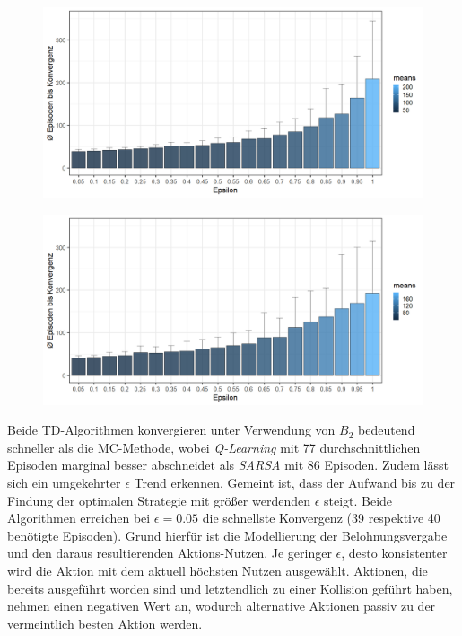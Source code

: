 \begin{figure}[H]
    \centering
    \begin{minipage}{.5\textwidth}
      \centering
      \includegraphics[width=\textwidth]{images/SimpleZ2B2QLearningA}
      \label{fig:test1}
    \end{minipage}%
    \begin{minipage}{.5\textwidth}
      \centering
      \includegraphics[width=\textwidth]{images/SimpleZ2B2SarsaA}
      \label{fig:test2}
    \end{minipage}
\end{figure}
Beide TD-Algorithmen konvergieren unter Verwendung von $B_2$ bedeutend schneller als die MC-Methode, wobei \textit{Q-Learning} mit 77 durchschnittlichen Episoden marginal besser abschneidet als \textit{SARSA} mit 86 Episoden. Zudem lässt sich ein umgekehrter $\epsilon$ Trend erkennen. Gemeint ist, dass der Aufwand bis zu der Findung der optimalen Strategie mit größer werdenden $\epsilon$ steigt. Beide Algorithmen erreichen bei $\epsilon = 0.05$ die schnellste Konvergenz (39 respektive 40 benötigte Episoden). Grund hierfür ist die Modellierung der Belohnungsvergabe und den daraus resultierenden Aktions-Nutzen. Je geringer $\epsilon$, desto konsistenter wird die Aktion mit dem aktuell höchsten Nutzen ausgewählt. Aktionen, die bereits  ausgeführt worden sind und letztendlich zu einer Kollision geführt haben, nehmen einen negativen Wert an, wodurch alternative Aktionen passiv zu der vermeintlich besten Aktion werden. 
\par 

